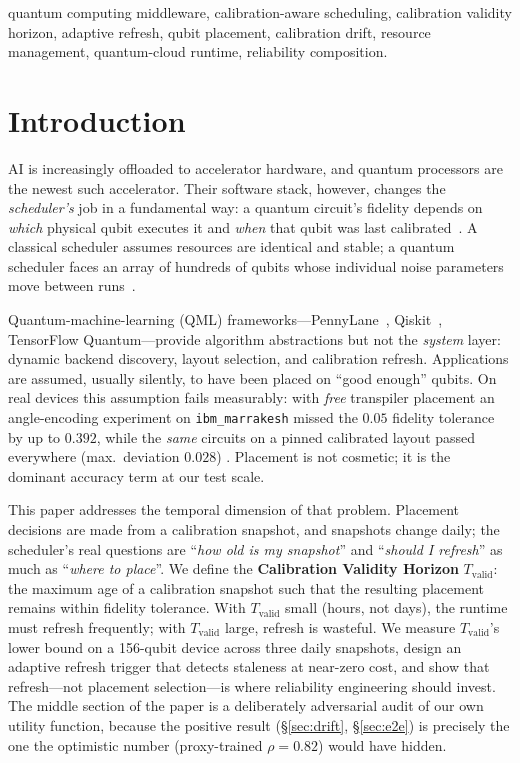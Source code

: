 \documentclass[journal,10pt,twocolumn]{IEEEtran}
\begin{document}
\begin{IEEEkeywords}
quantum computing middleware, calibration-aware scheduling, calibration validity horizon, adaptive refresh,
qubit placement, calibration drift, resource management, quantum-cloud runtime, reliability composition.
\end{IEEEkeywords}

\section{Introduction}
 AI is increasingly offloaded to accelerator hardware, and quantum processors are the
newest such accelerator. Their software stack, however, changes the \emph{scheduler's} job in a fundamental way: a
quantum circuit's fidelity depends on \emph{which} physical qubit executes it and \emph{when} that qubit was last
calibrated~\cite{preskill2018,arute2019,murali2019noise,li2019sabre}. A classical scheduler assumes resources are
identical and stable; a quantum scheduler faces an array of hundreds of qubits whose individual noise parameters
move between runs~\cite{ibmcalib,kanazawa2021,vanberg2023}.

Quantum-machine-learning (QML) frameworks---PennyLane~\cite{berholm2018}, Qiskit~\cite{qiskit}, TensorFlow
Quantum---provide algorithm abstractions but not the \emph{system} layer: dynamic backend discovery, layout
selection, and calibration refresh. Applications are assumed, usually silently, to have been placed on ``good
enough'' qubits. On real devices this assumption fails measurably: with \emph{free} transpiler placement an
angle-encoding experiment on \texttt{ibm\_marrakesh} missed the $0.05$ fidelity tolerance by up to $0.392$,
while the \emph{same} circuits on a pinned calibrated layout passed everywhere (max.\ deviation $0.028$)
\cite{tangpu}. Placement is not cosmetic; it is the dominant accuracy term at our test scale.

This paper addresses the temporal dimension of that problem. Placement decisions are made from a calibration
snapshot, and snapshots change daily; the scheduler's real questions are ``\emph{how old is my snapshot}'' and
``\emph{should I refresh}'' as much as ``\emph{where to place}''. We define the \textbf{Calibration Validity
Horizon} $T_{\mathrm{valid}}$: the maximum age of a calibration snapshot such that the resulting placement
remains within fidelity tolerance. With $T_{\mathrm{valid}}$ small (hours, not days), the runtime must refresh
frequently; with $T_{\mathrm{valid}}$ large, refresh is wasteful. We measure $T_{\mathrm{valid}}$'s lower bound
on a 156-qubit device across three daily snapshots, design an adaptive refresh trigger that detects staleness at
near-zero cost, and show that refresh---not placement selection---is where reliability engineering should invest.
The middle section of the paper is a deliberately adversarial audit of our own utility function, because the
positive result (\S\ref{sec:drift}, \S\ref{sec:e2e}) is precisely the one the optimistic number (proxy-trained
$\rho{=}0.82$) would have hidden.
\end{document}

